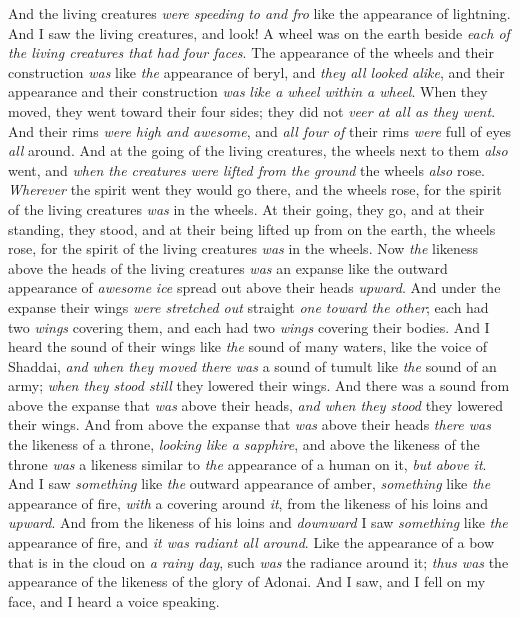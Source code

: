 \begin{biblechapter}
\verse And the living creatures \textit{were speeding to and fro} like the appearance of lightning.
\verse And I saw the living creatures, and look! A wheel was on the earth beside \textit{each of the living creatures that had four faces}.
\verse The appearance of the wheels and their construction \textit{was} like \textit{the} appearance of beryl, and \textit{they all looked alike}, and their appearance and their construction \textit{was} \textit{like a wheel within a wheel}.
\verse When they moved, they went toward their four sides; they did not \textit{veer at all as they went}.
\verse And their rims \textit{were high and awesome}, and \textit{all four of} their rims \textit{were} full of eyes \textit{all} around.
\verse And at the going of the living creatures, the wheels next to them \textit{also} went, and \textit{when the creatures were lifted from the ground} the wheels \textit{also} rose.
\verse \textit{Wherever} the spirit went they would go there, and the wheels rose, for the spirit of the living creatures \textit{was} in the wheels.
\verse At their going, they go, and at their standing, they stood, and at their being lifted up from on the earth, the wheels rose, for the spirit of the living creatures \textit{was} in the wheels.
\verse Now \textit{the} likeness above the heads of the living creatures \textit{was} an expanse like the outward appearance of \textit{awesome} \textit{ice} spread out above their heads \textit{upward}.
\verse And under the expanse their wings \textit{were stretched out} straight \textit{one toward the other}; each had two \textit{wings} covering them, and each had two \textit{wings} covering their bodies.
\verse And I heard the sound of their wings like \textit{the} sound of many waters, like the voice of Shaddai, \textit{and} \textit{when they moved} \textit{there was} a sound of tumult like \textit{the} sound of an army; \textit{when they stood still} they lowered their wings.
\verse And there was a sound from above the expanse that \textit{was} above their heads, \textit{and when they stood} they lowered their wings.
\verse And from above the expanse that \textit{was} above their heads \textit{there was} the likeness of a throne, \textit{looking like a sapphire}, and above the likeness of the throne \textit{was} a likeness similar to \textit{the} appearance of a human on it, \textit{but} \textit{above it}.
\verse And I saw \textit{something} like \textit{the} outward appearance of amber, \textit{something} like \textit{the} appearance of fire, \textit{with} a covering around \textit{it}, from the likeness of his loins and \textit{upward}. And from the likeness of his loins and \textit{downward} I saw \textit{something} like \textit{the} appearance of fire, and \textit{it was radiant all around}.
\verse Like the appearance of a bow that is in the cloud on \textit{a rainy day}, such \textit{was} the radiance around it; \textit{thus was} the appearance of the likeness of the glory of Adonai. And I saw, and I fell on my face, and I heard a voice speaking.
\end{biblechapter}

